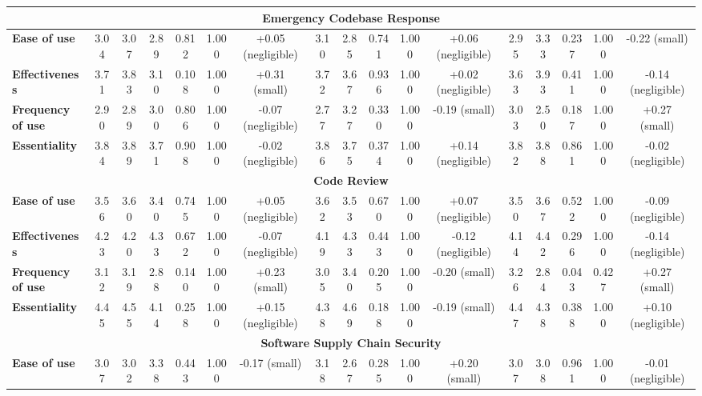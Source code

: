 \begin{tiny}
\begin{longtable}{@{}lcccccccccccccccc@{}}
\multicolumn{17}{c}{\textbf{Emergency Codebase Response}} \\ \midrule
\textbf{Ease of use} & 3.04 & 3.07 & 2.89 & 0.812 & 1.000 & \multicolumn{1}{c|}{+0.05 (negligible)} & 3.10 & 2.85 & 0.741 & 1.000 & \multicolumn{1}{c|}{+0.06 (negligible)} & 2.95 & 3.33 & 0.237 & 1.000 & -0.22 (small) \\ \midrule
\textbf{Effectiveness} & 3.71 & 3.83 & 3.10 & 0.108 & 1.000 & \multicolumn{1}{c|}{+0.31 (small)} & 3.72 & 3.67 & 0.936 & 1.000 & \multicolumn{1}{c|}{+0.02 (negligible)} & 3.63 & 3.93 & 0.411 & 1.000 & -0.14 (negligible) \\ \midrule
\textbf{Frequency of use} & 2.90 & 2.89 & 3.00 & 0.806 & 1.000 & \multicolumn{1}{c|}{-0.07 (negligible)} & 2.77 & 3.27 & 0.330 & 1.000 & \multicolumn{1}{c|}{-0.19 (small)} & 3.03 & 2.50 & 0.187 & 1.000 & +0.27 (small) \\ \midrule
\textbf{Essentiality} & 3.84 & 3.89 & 3.71 & 0.908 & 1.000 & \multicolumn{1}{c|}{-0.02 (negligible)} & 3.86 & 3.75 & 0.374 & 1.000 & \multicolumn{1}{c|}{+0.14 (negligible)} & 3.82 & 3.88 & 0.861 & 1.000 & -0.02 (negligible) \\ \midrule
\multicolumn{17}{c}{\textbf{Code Review}} \\ \midrule
\textbf{Ease of use} & 3.56 & 3.60 & 3.40 & 0.745 & 1.000 & \multicolumn{1}{c|}{+0.05 (negligible)} & 3.62 & 3.53 & 0.670 & 1.000 & \multicolumn{1}{c|}{+0.07 (negligible)} & 3.50 & 3.67 & 0.522 & 1.000 & -0.09 (negligible) \\ \midrule
\textbf{Effectiveness} & 4.23 & 4.20 & 4.33 & 0.672 & 1.000 & \multicolumn{1}{c|}{-0.07 (negligible)} & 4.19 & 4.33 & 0.443 & 1.000 & \multicolumn{1}{c|}{-0.12 (negligible)} & 4.14 & 4.42 & 0.296 & 1.000 & -0.14 (negligible) \\ \midrule
\textbf{Frequency of use} & 3.12 & 3.19 & 2.88 & 0.140 & 1.000 & \multicolumn{1}{c|}{+0.23 (small)} & 3.05 & 3.40 & 0.205 & 1.000 & \multicolumn{1}{c|}{-0.20 (small)} & 3.26 & 2.84 & 0.043 & 0.427 & +0.27 (small) \\ \midrule
\textbf{Essentiality} & 4.45 & 4.55 & 4.14 & 0.258 & 1.000 & \multicolumn{1}{c|}{+0.15 (negligible)} & 4.38 & 4.69 & 0.188 & 1.000 & \multicolumn{1}{c|}{-0.19 (small)} & 4.47 & 4.38 & 0.388 & 1.000 & +0.10 (negligible) \\ \midrule
\multicolumn{17}{c}{\textbf{Software Supply Chain Security}} \\ \midrule
\textbf{Ease of use} & 3.07 & 3.02 & 3.38 & 0.443 & 1.000 & \multicolumn{1}{c|}{-0.17 (small)} & 3.18 & 2.67 & 0.285 & 1.000 & \multicolumn{1}{c|}{+0.20 (small)} & 3.07 & 3.08 & 0.961 & 1.000 & -0.01 (negligible) \\ \midrule

\end{longtable}
\end{tiny}
